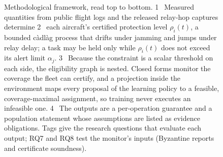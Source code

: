 \begin{figure}[t]
{}
\caption{Methodological framework, read top to bottom. \textcircled{\scriptsize 1}~Measured
quantities from public flight logs and the released relay-hop captures determine \textcircled{\scriptsize 2}~each aircraft's
certified protection level $\rho_i(t)$, a bounded c\`adl\`ag process that drifts under
jamming and jumps under relay delay; a task may be held only while $\rho_i(t)$ does not
exceed its alert limit $\alpha_j$. \textcircled{\scriptsize 3}~Because the constraint is a
scalar threshold on each side, the eligibility graph is nested. Closed forms monitor the
coverage the fleet can certify, and a projection inside the environment maps every proposal
of the learning policy to a feasible, coverage-maximal assignment, so training never executes
an infeasible one. \textcircled{\scriptsize 4}~The outputs are a per-operation guarantee and
a population statement whose assumptions are listed as evidence obligations. Tags give the
research questions that evaluate each output; RQ7 and RQ8 test the monitor's inputs
(Byzantine reports and certificate soundness).}
\label{fig:framework}
\end{figure}
